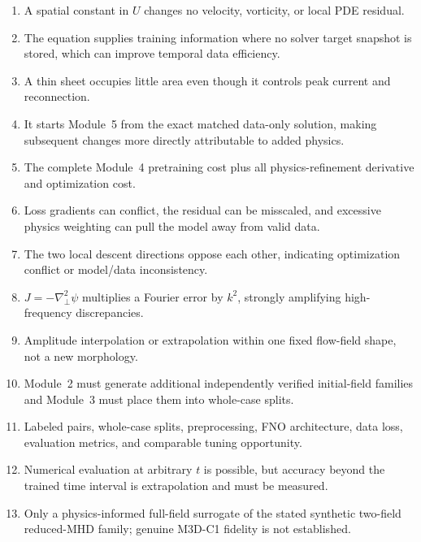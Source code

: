 \documentclass[11pt]{article}
\newcommand{\Lap}{\nabla_\perp^2}
\begin{document}
\begin{enumerate}[label=\textbf{A\arabic*.}]
  \item A spatial constant in $U$ changes no velocity, vorticity, or local PDE residual.
  \item The equation supplies training information where no solver target snapshot is stored, which can improve temporal data efficiency.
  \item A thin sheet occupies little area even though it controls peak current and reconnection.
  \item It starts Module~5 from the exact matched data-only solution, making subsequent changes more directly attributable to added physics.
  \item The complete Module~4 pretraining cost plus all physics-refinement derivative and optimization cost.
  \item Loss gradients can conflict, the residual can be misscaled, and excessive physics weighting can pull the model away from valid data.
  \item The two local descent directions oppose each other, indicating optimization conflict or model/data inconsistency.
  \item $J=-\Lap\psi$ multiplies a Fourier error by $k^2$, strongly amplifying high-frequency discrepancies.
  \item Amplitude interpolation or extrapolation within one fixed flow-field shape, not a new morphology.
  \item Module~2 must generate additional independently verified initial-field families and Module~3 must place them into whole-case splits.
  \item Labeled pairs, whole-case splits, preprocessing, FNO architecture, data loss, evaluation metrics, and comparable tuning opportunity.
  \item Numerical evaluation at arbitrary $t$ is possible, but accuracy beyond the trained time interval is extrapolation and must be measured.
  \item Only a physics-informed full-field surrogate of the stated synthetic two-field reduced-MHD family; genuine M3D-C1 fidelity is not established.
\end{enumerate}
\end{document}
